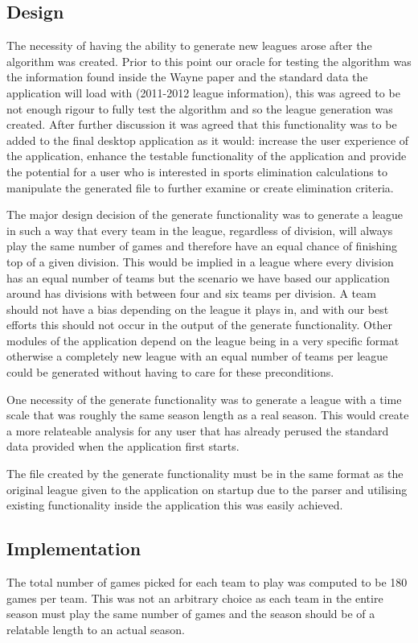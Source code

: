 \subsection{Design}
The necessity of having the ability to generate new leagues arose
after the algorithm was created. Prior to this point our oracle for
testing the algorithm was the information found inside the Wayne paper
\cite{Wayne} and the standard data the application will load with
(2011-2012 league information), this was agreed to be not enough
rigour to fully test the algorithm and so the league generation was
created. After further discussion it was agreed that this
functionality was to be added to the final desktop application as it
would: increase the user experience of the application, enhance the
testable functionality of the application and provide the potential
for a user who is interested in sports elimination calculations to
manipulate the generated file to further examine or create elimination
criteria.

The major design decision of the generate functionality was to
generate a league in such a way that every team in the league,
regardless of division, will always play the same number of games and
therefore have an equal chance of finishing top of a given
division. This would be implied in a league where every division has
an equal number of teams but the scenario we have based our
application around has divisions with between four and six teams per
division. A team should not have a bias depending on the league it
plays in, and with our best efforts this should not occur in the
output of the generate functionality. Other
modules of the application depend on the league being in a very
specific format otherwise a completely new league with an equal number
of teams per league could be generated without having to care for
these preconditions. 

One necessity of the generate functionality was to generate a league
with a time scale that was roughly the same season length as a real
season. This would create a more relateable analysis for any user that
has already perused the standard data provided when the application
first starts.

The file created by the generate functionality must be in the same
format as the original league given to the application on startup due
to the parser and utilising existing functionality inside the
application this was easily achieved.

\subsection{Implementation}
The total number of games picked for each team to play was computed to
be 180 games per team. This was not an arbitrary choice as each team
in the entire season must play the same number of games and the season
should be of a relatable length to an actual season.

